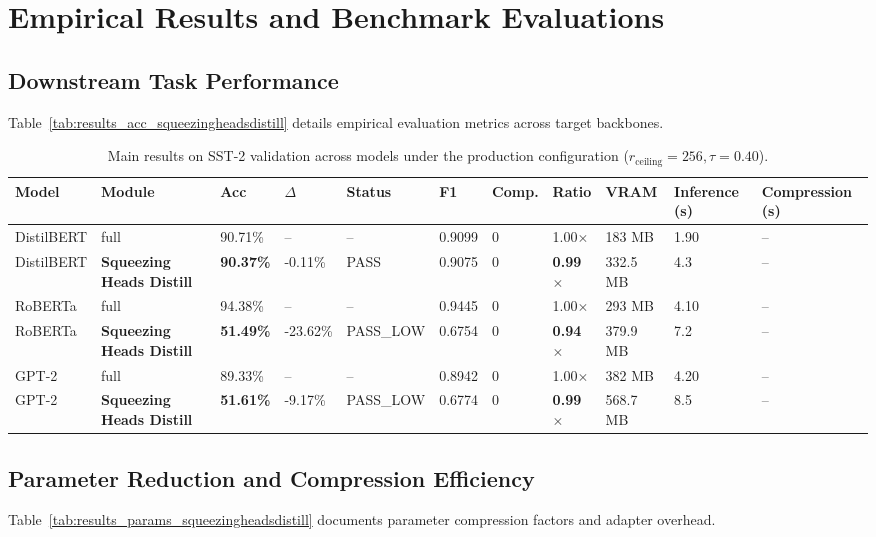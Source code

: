 \section{Empirical Results and Benchmark Evaluations}

\subsection{Downstream Task Performance}
Table~\ref{tab:results_acc_squeezingheadsdistill} details empirical evaluation metrics across target backbones.

\begin{table}[t]
\centering
\small
\begin{tabular}{lllllllllll}
\toprule
\textbf{Model} & \textbf{Module} & \textbf{Acc} & \textbf{$\Delta$} & \textbf{Status} & \textbf{F1} & \textbf{Comp.} & \textbf{Ratio} & \textbf{VRAM} & \textbf{Inference (s)} & \textbf{Compression (s)} \\
\midrule
DistilBERT & full & 90.71\% & -- & -- & 0.9099 & 0 & 1.00$\times$ & 183 MB & 1.90 & -- \\
DistilBERT & \textbf{Squeezing Heads Distill} & \textbf{90.37\%} & -0.11\% & PASS & 0.9075 & 0 & \textbf{0.99$\times$} & 332.5 MB & 4.3 & -- \\
RoBERTa & full & 94.38\% & -- & -- & 0.9445 & 0 & 1.00$\times$ & 293 MB & 4.10 & -- \\
RoBERTa & \textbf{Squeezing Heads Distill} & \textbf{51.49\%} & -23.62\% & PASS_LOW & 0.6754 & 0 & \textbf{0.94$\times$} & 379.9 MB & 7.2 & -- \\
GPT-2 & full & 89.33\% & -- & -- & 0.8942 & 0 & 1.00$\times$ & 382 MB & 4.20 & -- \\
GPT-2 & \textbf{Squeezing Heads Distill} & \textbf{51.61\%} & -9.17\% & PASS_LOW & 0.6774 & 0 & \textbf{0.99$\times$} & 568.7 MB & 8.5 & -- \\
\bottomrule
\end{tabular}
\caption{Main results on SST-2 validation across models under the production configuration ($r_{\mathrm{ceiling}}=256, \tau=0.40$).}
\label{tab:main_sst2}
\end{table}

\subsection{Parameter Reduction and Compression Efficiency}
Table~\ref{tab:results_params_squeezingheadsdistill} documents parameter compression factors and adapter overhead.

